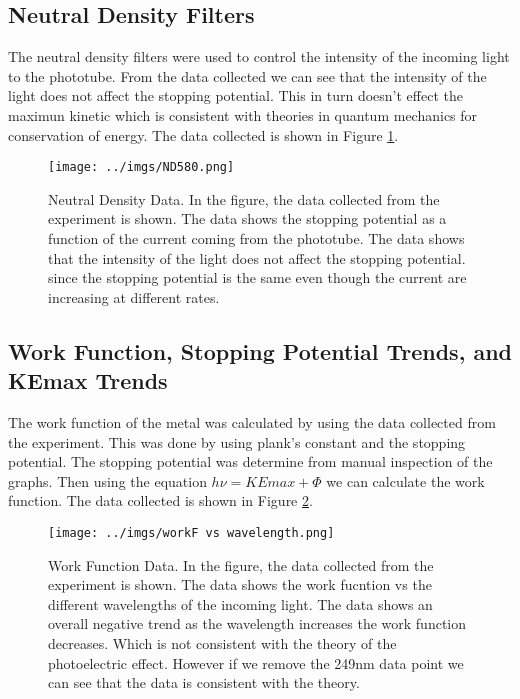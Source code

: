 \documentclass[12pt]{article}
\begin{document}
        \subsection{Neutral Density Filters}
        The neutral density filters were used to control the intensity of the incoming light to the phototube. From the data collected
        we can see that the intensity of the light does not affect the stopping potential. This in turn doesn't effect the maximun kinetic
        which is consistent with theories in quantum mechanics for conservation of energy. The data collected is shown in Figure \ref{fig: ND Data}.

        \begin{figure}[!h]
                \centering
                \texttt{[image: ../imgs/ND580.png]}
                \caption{Neutral Density Data. In the figure, the data collected from the experiment is shown. The data shows the 
                stopping potential as a function of the current coming from the phototube. The data shows that the intensity of the light
                does not affect the stopping potential. since the stopping potential is the same even though the current
                are increasing at different rates.}
                \label{fig: ND Data}
        \end{figure}

        \newpage

        \subsection{Work Function, Stopping Potential Trends, and KEmax Trends}
        The work function of the metal was calculated by using the data collected from the experiment. This was done by using plank's constant
        and the stopping potential. The stopping potential was determine from manual inspection of the graphs. Then using the equation
        \( h\nu = KEmax + \Phi \) we can calculate the work function. The data collected is shown in Figure \ref{fig: Work Function Data}.

        \begin{figure}[!h]
                \centering
                \texttt{[image: ../imgs/workF vs wavelength.png]}
                \caption{Work Function Data. In the figure, the data collected from the experiment is shown. The data shows the work
                fucntion vs the different wavelengths of the incoming light. The data shows an overall negative trend as the wavelength
                increases the work function decreases. Which is not consistent with the theory of the photoelectric effect. However if we
                remove the 249nm data point we can see that the data is consistent with the theory.}
                \label{fig: Work Function Data}
        \end{figure}
\end{document}
